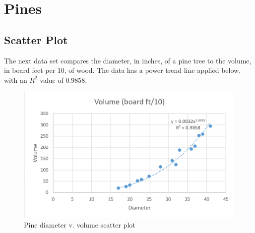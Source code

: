 \documentclass[12pt]{extarticle}
\begin{document}
\section{Pines}
\subsection{Scatter Plot}
The next data set compares the diameter, in inches, of a pine tree to the volume, in board feet per 10, of wood. The data has a power trend line applied below, with an $R^2$ value of $0.9858$. 
\begin{figure}[ht!]
  \includegraphics[width=\linewidth]{PineScatter.PNG}
  \caption{Pine diameter v. volume scatter plot}
\end{figure}
\newpage
\end{document}
